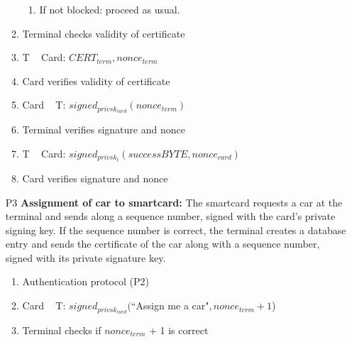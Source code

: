 \documentclass[a4paper]{article}
\newcommand{\escapevariablewithdashinmathmode}[1]{{\operatorname{\mathit{#1}}}}
\begin{document}
\begin{itemize}
\begin{enumerate}
\begin{enumerate}
            \item If not blocked: proceed as usual.
        \end{enumerate}
        \item Terminal checks validity of certificate
        \item T \textrightarrow~ Card: $CERT_{term}, nonce_{term}$
        \item Card verifies validity of certificate
        \item Card \textrightarrow~ T: $signed_{privsk_{card}}(nonce_{term})$
        \item Terminal verifies signature and nonce
        \item T \textrightarrow~ Card: $signed_{privsk_t}(successBYTE, nonce_{card})$
        \item Card verifies signature and nonce
    \end{enumerate}
    \item[P3] \textbf{Assignment of car to smartcard:} The smartcard requests a car at the terminal and sends along a sequence number, signed with the card's private signing key. If the sequence number is correct, the terminal creates a database entry and sends the certificate of the car along with a sequence number, signed with its private signature key.
    \begin{enumerate}
        \item Authentication protocol (P2)
        \item Card \textrightarrow~ T: $signed_{privsk_{card}}($``Assign me a car"$, nonce_{term} + 1$)
        \item Terminal checks if $nonce_{term}$ + 1 is correct

\end{enumerate}
\end{itemize}
\end{document}
